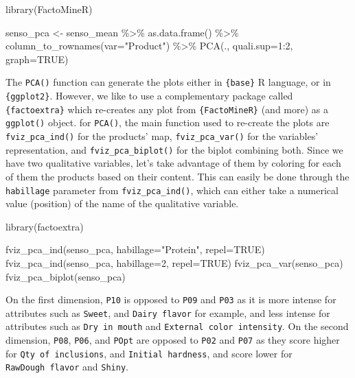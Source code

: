 \documentclass[
]{book}
\newenvironment{Shaded}{\begin{snugshade}}{\end{snugshade}}
\newcommand{\AttributeTok}[1]{\textcolor[rgb]{0.77,0.63,0.00}{#1}}
\newcommand{\ConstantTok}[1]{\textcolor[rgb]{0.00,0.00,0.00}{#1}}
\newcommand{\DecValTok}[1]{\textcolor[rgb]{0.00,0.00,0.81}{#1}}
\newcommand{\FunctionTok}[1]{\textcolor[rgb]{0.00,0.00,0.00}{#1}}
\newcommand{\NormalTok}[1]{#1}
\newcommand{\OtherTok}[1]{\textcolor[rgb]{0.56,0.35,0.01}{#1}}
\newcommand{\SpecialCharTok}[1]{\textcolor[rgb]{0.00,0.00,0.00}{#1}}
\newcommand{\StringTok}[1]{\textcolor[rgb]{0.31,0.60,0.02}{#1}}
\begin{document}
\begin{Shaded}
\begin{Highlighting}[]
\FunctionTok{library}\NormalTok{(FactoMineR)}

\NormalTok{senso\_pca }\OtherTok{\textless{}{-}}\NormalTok{ senso\_mean }\SpecialCharTok{\%\textgreater{}\%} 
  \FunctionTok{as.data.frame}\NormalTok{() }\SpecialCharTok{\%\textgreater{}\%} 
  \FunctionTok{column\_to\_rownames}\NormalTok{(}\AttributeTok{var=}\StringTok{"Product"}\NormalTok{) }\SpecialCharTok{\%\textgreater{}\%} 
  \FunctionTok{PCA}\NormalTok{(., }\AttributeTok{quali.sup=}\DecValTok{1}\SpecialCharTok{:}\DecValTok{2}\NormalTok{, }\AttributeTok{graph=}\ConstantTok{TRUE}\NormalTok{)}
\end{Highlighting}
\end{Shaded}

The \texttt{PCA()} function can generate the plots either in \texttt{\{base\}} R language, or in \texttt{\{ggplot2\}}. However, we like to use a complementary package called \texttt{\{factoextra\}} which re-creates any plot from \texttt{\{FactoMineR\}} (and more) as a \texttt{ggplot()} object. for \texttt{PCA()}, the main function used to re-create the plots are \texttt{fviz\_pca\_ind()} for the products' map, \texttt{fviz\_pca\_var()} for the variables' representation, and \texttt{fviz\_pca\_biplot()} for the biplot combining both.
Since we have two qualitative variables, let's take advantage of them by coloring for each of them the products based on their content. This can easily be done through the \texttt{habillage} parameter from \texttt{fviz\_pca\_ind()}, which can either take a numerical value (position) of the name of the qualitative variable.

\begin{Shaded}
\begin{Highlighting}[]
\FunctionTok{library}\NormalTok{(factoextra)}

\FunctionTok{fviz\_pca\_ind}\NormalTok{(senso\_pca, }\AttributeTok{habillage=}\StringTok{"Protein"}\NormalTok{, }\AttributeTok{repel=}\ConstantTok{TRUE}\NormalTok{)}
\FunctionTok{fviz\_pca\_ind}\NormalTok{(senso\_pca, }\AttributeTok{habillage=}\DecValTok{2}\NormalTok{, }\AttributeTok{repel=}\ConstantTok{TRUE}\NormalTok{)}
\FunctionTok{fviz\_pca\_var}\NormalTok{(senso\_pca)}
\FunctionTok{fviz\_pca\_biplot}\NormalTok{(senso\_pca)}
\end{Highlighting}
\end{Shaded}

On the first dimension, \texttt{P10} is opposed to \texttt{P09} and \texttt{P03} as it is more intense for attributes such as \texttt{Sweet}, and \texttt{Dairy\ flavor} for example, and less intense for attributes such as \texttt{Dry\ in\ mouth} and \texttt{External\ color\ intensity}. On the second dimension, \texttt{P08}, \texttt{P06}, and \texttt{POpt} are opposed to \texttt{P02} and \texttt{P07} as they score higher for \texttt{Qty\ of\ inclusions}, and \texttt{Initial\ hardness}, and score lower for \texttt{RawDough\ flavor} and \texttt{Shiny}.
\end{document}
